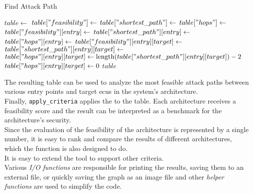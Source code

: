\begin{algorithm}[h]
    \caption{Find Attack Path}
    \label{alg:findattackpath}
    \begin{algorithmic}[1]
        \State $table \gets$ 
        \State $table["feasibility"] \gets$ 
        \State $table["shortest\_path"] \gets$ 
        \State $table["hops"] \gets$ 
            \State $table["feasibility"][entry] \gets$ 
            \State $table["shortest\_path"][entry] \gets$ 
            \State $table["hops"][entry] \gets$ 
                \State $table["feasibility"][entry][target] \gets$ 
                \State $table["shortest\_path"][entry][target] \gets$ 
                    \State $table["hops"][entry][target] \gets \text{length}(table["shortest\_path"][entry][target]) - 2$
                \Else
                    \State $table["hops"][entry][target] \gets 0$
                \EndIf
            \EndFor
        \EndFor
        \State \Return $table$
    \EndProcedure
    \end{algorithmic}
\end{algorithm}
    
The resulting table can be used to analyze the most feasible attack paths between 
various entry points and target \acrshort{ecu}s in the system's architecture.\\

Finally, \texttt{apply\_criteria} applies the  to the table.
Each architecture receives a feasibility score and the result can be interpreted as a benchmark for the architecture's security.\\
Since the evaluation of the feasibility of the architecture is represented by a single number, 
it is easy to rank and compare the results of different architectures, which the function is also designed to do.\\

It is easy to extend the tool to support other criteria.\\

Various \textit{I/O functions} are responsible for printing the results, saving them to an external file, or quickly saving the graph as an image file
and other \textit{helper functions} are used to simplify the code.

